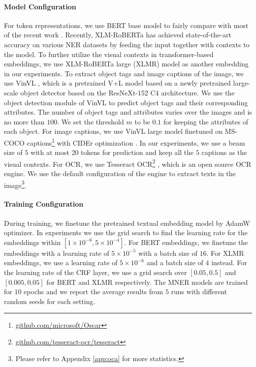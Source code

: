 \documentclass[11pt]{article}
\begin{document}
\paragraph{Model Configuration}
For token representations, we use BERT base model to fairly compare with most of the recent work \citep{yu-etal-2020-improving-multimodal,zhang2021multi,Sun2021RpBERTAT}. Recently, XLM-RoBERTa has achieved state-of-the-art accuracy on various NER datasets by feeding the input together with contexts to the model. To further utilize the visual contexts in transformer-based embeddings, we use XLM-RoBERTa large (XLMR) model as another embedding in our experiments. 
To extract object tags and image captions of the image, we use VinVL \citep{zhang2021vinvl}, which is a pretrained V+L model based on a newly pretrained large-scale object detector based on the ResNeXt-152 C4 architecture. We use the object detection module of VinVL to predict object tags and their corresponding attributes. The number of object tags and attributes varies over the images and is no more than $100$. We set the threshold $m$ to be $0.1$ for keeping the attributes of each object. For image captions, we use VinVL large model finetuned on MS-COCO \citep{lin2014microsoft} captions\footnote{\url{github.com/microsoft/Oscar}} with CIDEr optimization \citep{rennie2017self}. In our experiments, we use a beam size of $5$ with at most 20 tokens for prediction and keep all the $5$ captions as the visual contexts. For OCR, we use Tesseract OCR\footnote{\url{github.com/tesseract-ocr/tesseract}} \citep{smith2007overview}, which is an open source OCR engine. We use the default configuration of the engine to extract texts in the image\footnote{Please refer to Appendix \ref{app:oca} for more statistics.}.

\paragraph{Training Configuration}
During training, we finetune the pretrained textual embedding model by AdamW \citep{loshchilov2018decoupled} optimizer. In experiments we use the grid search to find the learning rate for the embeddings within $[1\times 10^{-6}, 5\times 10^{-4}]$. For BERT embeddings, we finetune the embeddings with a learning rate of $5\times 10^{-5}$ with a batch size of $16$. For XLMR embeddings, we use a learning rate of $5\times 10^{-6}$ and a batch size of $4$ instead. For the learning rate of the CRF layer, we use a grid search over $[0.05,0.5]$ and $[0.005,0.05]$ for BERT and XLMR respectively. The MNER models are trained for $10$ epochs and we report the average results from $5$ runs with different random seeds for each setting.
\end{document}
